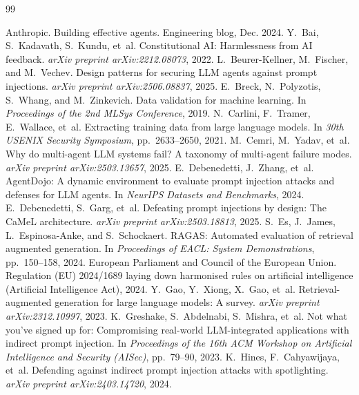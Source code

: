 \documentclass[10pt,a4paper,twocolumn]{article}
\begin{document}
\begingroup
\footnotesize
\setlength{\columnsep}{18pt}
\begin{thebibliography}{99}
\setlength{\itemsep}{1.5pt}\setlength{\parsep}{0pt}

 Anthropic. Building effective agents. Engineering blog, Dec. 2024.
 Y.~Bai, S.~Kadavath, S.~Kundu, et~al. Constitutional AI: Harmlessness from AI feedback. \emph{arXiv preprint arXiv:2212.08073}, 2022.
 L.~Beurer-Kellner, M.~Fischer, and M.~Vechev. Design patterns for securing LLM agents against prompt injections. \emph{arXiv preprint arXiv:2506.08837}, 2025.
 E.~Breck, N.~Polyzotis, S.~Whang, and M.~Zinkevich. Data validation for machine learning. In \emph{Proceedings of the 2nd MLSys Conference}, 2019.
 N.~Carlini, F.~Tramer, E.~Wallace, et~al. Extracting training data from large language models. In \emph{30th USENIX Security Symposium}, pp.~2633--2650, 2021.
 M.~Cemri, M.~Yadav, et~al. Why do multi-agent LLM systems fail? A taxonomy of multi-agent failure modes. \emph{arXiv preprint arXiv:2503.13657}, 2025.
 E.~Debenedetti, J.~Zhang, et~al. AgentDojo: A dynamic environment to evaluate prompt injection attacks and defenses for LLM agents. In \emph{NeurIPS Datasets and Benchmarks}, 2024.
 E.~Debenedetti, S.~Garg, et~al. Defeating prompt injections by design: The CaMeL architecture. \emph{arXiv preprint arXiv:2503.18813}, 2025.
 S.~Es, J.~James, L.~Espinosa-Anke, and S.~Schockaert. RAGAS: Automated evaluation of retrieval augmented generation. In \emph{Proceedings of EACL: System Demonstrations}, pp.~150--158, 2024.
 European Parliament and Council of the European Union. Regulation (EU) 2024/1689 laying down harmonised rules on artificial intelligence (Artificial Intelligence Act), 2024.
 Y.~Gao, Y.~Xiong, X.~Gao, et~al. Retrieval-augmented generation for large language models: A survey. \emph{arXiv preprint arXiv:2312.10997}, 2023.
 K.~Greshake, S.~Abdelnabi, S.~Mishra, et~al. Not what you've signed up for: Compromising real-world LLM-integrated applications with indirect prompt injection. In \emph{Proceedings of the 16th ACM Workshop on Artificial Intelligence and Security (AISec)}, pp.~79--90, 2023.
 K.~Hines, F.~Cahyawijaya, et~al. Defending against indirect prompt injection attacks with spotlighting. \emph{arXiv preprint arXiv:2403.14720}, 2024.

\end{thebibliography}
\end{document}
